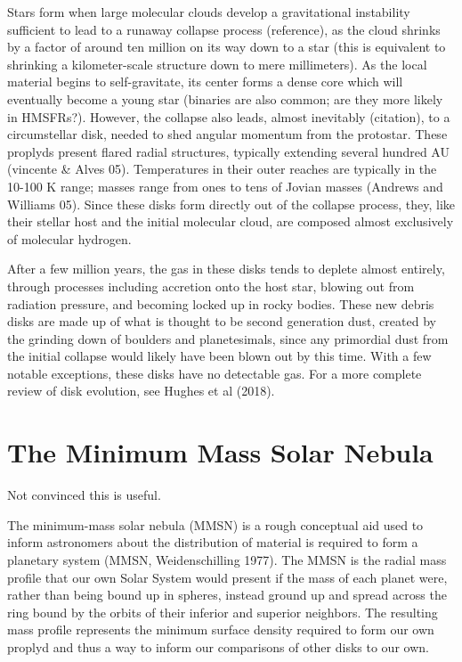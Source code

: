 Stars form when large molecular clouds develop a gravitational instability sufficient to lead to a runaway collapse process (reference), as the cloud shrinks by a factor of around ten million on its way down to a star (this is equivalent to shrinking a kilometer-scale structure down to mere millimeters). As the local material begins to self-gravitate, its center forms a dense core which will eventually become a young star (binaries are also common; are they more likely in HMSFRs?). However, the collapse also leads, almost inevitably (citation), to a circumstellar disk, needed to shed angular momentum from the protostar. These proplyds present flared radial structures, typically extending several hundred AU (vincente & Alves 05). Temperatures in their outer reaches are typically in the 10-100 K range; masses range from ones to tens of Jovian masses (Andrews and Williams 05). Since these disks form directly out of the collapse process, they, like their stellar host and the initial molecular cloud, are composed almost exclusively of molecular hydrogen.

After a few million years, the gas in these disks tends to deplete almost entirely, through processes including accretion onto the host star, blowing out from radiation pressure, and becoming locked up in rocky bodies. These new debris disks are made up of what is thought to be second generation dust, created by the grinding down of boulders and planetesimals, since any primordial dust from the initial collapse would likely have been blown out by this time. With a few notable exceptions, these disks have no detectable gas. For a more complete review of disk evolution, see Hughes et al (2018).






\section{The Minimum Mass Solar Nebula}
Not convinced this is useful.

The minimum-mass solar nebula (MMSN) is a rough conceptual aid used to inform astronomers about the distribution of material is required to form a planetary system (MMSN, Weidenschilling 1977). The MMSN is the radial mass profile that our own Solar System would present if the mass of each planet were, rather than being bound up in spheres, instead ground up and spread across the ring bound by the orbits of their inferior and superior neighbors. The resulting mass profile represents the minimum surface density required to form our own proplyd and thus a way to inform our comparisons of other disks to our own.

